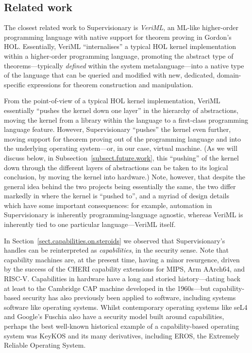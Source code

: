 \documentclass[a4paper, UKenglish, cleveref, autoref, thm-restate, colorlinks]{lipics-v2021}
\begin{document}
\subsection{Related work}

The closest related work to Supervisionary is \emph{VeriML}, an ML-like higher-order programming language with native support for theorem proving in Gordon's HOL.
Essentially, VeriML ``internalises'' a typical HOL kernel implementation within a higher-order programming language, promoting the abstract type of theorems---typically \emph{defined} within the system metalanguage---into a native type of the language that can be queried and modified with new, dedicated, domain-specific expressions for theorem construction and manipulation.

From the point-of-view of a typical HOL kernel implementation, VeriML essentially ``pushes the kernel down one layer'' in the hierarchy of abstractions, moving the kernel from a library within the language to a first-class programming language feature.
However, Supervisionary ``pushes'' the kernel even further, moving support for theorem proving out of the programming language and into the underlying operating system---or, in our case, virtual machine.
(As we will discuss below, in Subsection~\ref{subsect.future.work}, this ``pushing'' of the kernel down through the different layers of abstractions can be taken to its logical conclusion, by moving the kernel into hardware.)
Note, however, that despite the general idea behind the two projects being essentially the same, the two differ markedly in where the kernel is ``pushed to'', and a myriad of design details which have some important consequences: for example, automation in Supervisionary is inherently programming-language agnostic, whereas VeriML is inherently tied to one particular language---VeriML itself.

In Section~\ref{sect.capabilities.on.steroids} we observed that Supervisionary's handles can be reinterpreted as \emph{capabilities}, in the security sense.
Note that capability machines are, at the present time, having a minor resurgence, driven by the success of the CHERI capability extensions for MIPS, Arm AArch64, and RISC-V.
Capabilities in hardware have a long and storied history---dating back at least to the Cambridge CAP machine developed in the 1960s---but capability-based security has also previously been applied to software, including systems software like operating systems.
Whilst contemporary operating systems like seL4 and Google's Fuschia also have a security model built around capabilities, perhaps the best well-known historical example of a capability-based operating system was KeyKOS and its many derivatives, including EROS, the Extremely Reliable Operating System.
\end{document}
